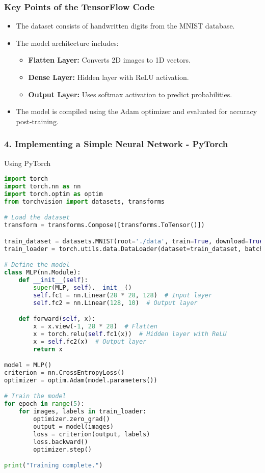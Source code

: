 \documentclass[aspectratio=169]{beamer}
\begin{document}
\begin{frame}
    \frametitle{Key Points of the TensorFlow Code}
    \begin{itemize}
        \item The dataset consists of handwritten digits from the MNIST database.
        \item The model architecture includes:
        \begin{itemize}
            \item \textbf{Flatten Layer:} Converts 2D images to 1D vectors.
            \item \textbf{Dense Layer:} Hidden layer with ReLU activation.
            \item \textbf{Output Layer:} Uses softmax activation to predict probabilities.
        \end{itemize}
        \item The model is compiled using the Adam optimizer and evaluated for accuracy post-training.
    \end{itemize}
\end{frame}

\begin{frame}[fragile]
    \frametitle{4. Implementing a Simple Neural Network - PyTorch}
    \begin{block}{Using PyTorch}
    \begin{lstlisting}[language=Python]
import torch
import torch.nn as nn
import torch.optim as optim
from torchvision import datasets, transforms

# Load the dataset
transform = transforms.Compose([transforms.ToTensor()])

train_dataset = datasets.MNIST(root='./data', train=True, download=True, transform=transform)
train_loader = torch.utils.data.DataLoader(dataset=train_dataset, batch_size=64, shuffle=True)

# Define the model
class MLP(nn.Module):
    def __init__(self):
        super(MLP, self).__init__()
        self.fc1 = nn.Linear(28 * 28, 128)  # Input layer
        self.fc2 = nn.Linear(128, 10)  # Output layer

    def forward(self, x):
        x = x.view(-1, 28 * 28)  # Flatten
        x = torch.relu(self.fc1(x))  # Hidden layer with ReLU
        x = self.fc2(x)  # Output layer
        return x

model = MLP()
criterion = nn.CrossEntropyLoss()
optimizer = optim.Adam(model.parameters())

# Train the model
for epoch in range(5):
    for images, labels in train_loader:
        optimizer.zero_grad()
        output = model(images)
        loss = criterion(output, labels)
        loss.backward()
        optimizer.step()

print("Training complete.")
    \end{lstlisting}
    \end{block}
\end{frame}
\end{document}
